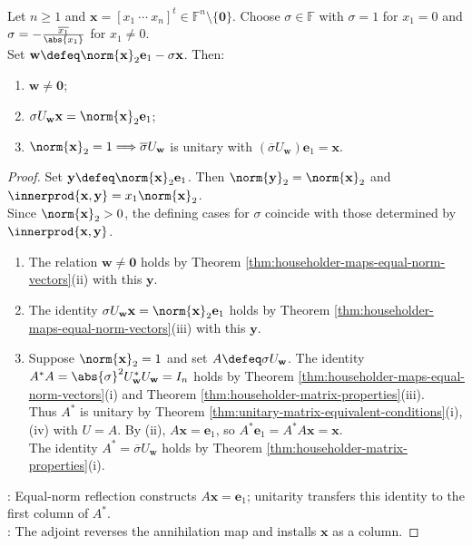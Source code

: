 \begin{corollary} \label{cor:householder-unitary-annihilator} \\
Let $n\geq1$ and $\mathbf{x}=[x_1\ \cdots\ x_n]^t\in\mathbb{F}^n\setminus\{\mathbf{0}\}$. Choose $\sigma\in\mathbb{F}$ with $\sigma=1$ for $x_1=0$ and $\sigma=-\frac{\overline{x_1}}{\abs{x_1}}$ for $x_1\neq0$.\\
Set $\mathbf{w}\defeq\norm{\mathbf{x}}_2\mathbf{e}_1-\sigma\mathbf{x}$. Then:
\begin{enumerate}[label=(\roman*)]
\setlength{\itemsep}{0pt}
\item $\mathbf{w}\neq\mathbf{0}$;
\item $\sigma U_{\mathbf{w}}\mathbf{x}=\norm{\mathbf{x}}_2\mathbf{e}_1$;
\item $\norm{\mathbf{x}}_2=1\Longrightarrow\overline{\sigma}U_{\mathbf{w}}$ is unitary with $(\overline{\sigma}U_{\mathbf{w}})\mathbf{e}_1=\mathbf{x}$.
\end{enumerate}
\begin{proof}
Set $\mathbf{y}\defeq\norm{\mathbf{x}}_2\mathbf{e}_1$. Then $\norm{\mathbf{y}}_2=\norm{\mathbf{x}}_2$ and $\innerprod{\mathbf{x},\mathbf{y}}=x_1\norm{\mathbf{x}}_2$.\\
Since $\norm{\mathbf{x}}_2>0$, the defining cases for $\sigma$ coincide with those determined by $\innerprod{\mathbf{x},\mathbf{y}}$.
\begin{enumerate}[label=(\roman*)]
\setlength{\itemsep}{0pt}
\item The relation $\mathbf{w}\neq\mathbf{0}$ holds by Theorem \ref{thm:householder-maps-equal-norm-vectors}(ii) with this $\mathbf{y}$.
\item The identity $\sigma U_{\mathbf{w}}\mathbf{x}=\norm{\mathbf{x}}_2\mathbf{e}_1$ holds by Theorem \ref{thm:householder-maps-equal-norm-vectors}(iii) with this $\mathbf{y}$.
\item Suppose $\norm{\mathbf{x}}_2=1$ and set $A\defeq\sigma U_{\mathbf{w}}$. The identity $A^*A=\abs{\sigma}^2U_{\mathbf{w}}^*U_{\mathbf{w}}=I_n$ holds by Theorem \ref{thm:householder-maps-equal-norm-vectors}(i) and Theorem \ref{thm:householder-matrix-properties}(iii).\\
Thus $A^*$ is unitary by Theorem \ref{thm:unitary-matrix-equivalent-conditions}(i),(iv) with $U=A$. By (ii), $A\mathbf{x}=\mathbf{e}_1$, so $A^*\mathbf{e}_1=A^*A\mathbf{x}=\mathbf{x}$.\\
The identity $A^*=\overline{\sigma}U_{\mathbf{w}}$ holds by Theorem \ref{thm:householder-matrix-properties}(i).
\end{enumerate}
: Equal-norm reflection constructs $A\mathbf{x}=\mathbf{e}_1$; unitarity transfers this identity to the first column of $A^*$.\\
: The adjoint reverses the annihilation map and installs $\mathbf{x}$ as a column.
\end{proof}
\end{corollary}
